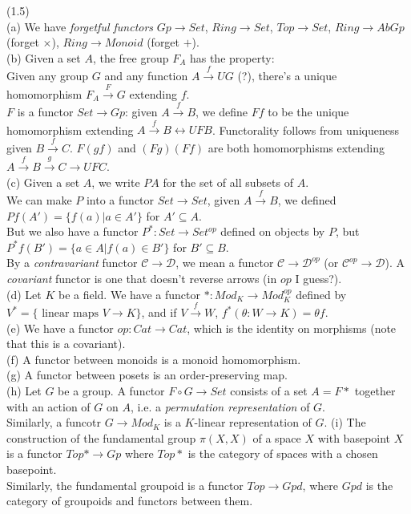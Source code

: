 \documentclass[a4paper]{article}
\begin{document}
\begin{eg} (1.5)\\
    (a) We have \emph{forgetful functors} $Gp \to Set$, $Ring\to Set$, $Top \to Set$, $Ring \to AbGp$ (forget $\times$), $Ring \to Monoid$ (forget $+$).\\
    (b) Given a set $A$, the free group $F_A$ has the property:\\
    Given any group $G$ and any function $A \xrightarrow{f} UG$ (?), there's a unique homomorphism $F_A \xrightarrow{F} G$ extending $f$.\\
    $F$ is a functor $Set\to Gp$: given $A \xrightarrow{f} B$, we define $Ff$ to be the unique homomorphism extending $A \xrightarrow{f} B \leftrightarrow UFB$. Functorality follows from uniqueness given $B \xrightarrow{f} C$. $F(gf)$ and $(Fg)(Ff)$ are both homomorphisms extending $A \xrightarrow{f} B \xrightarrow{g} C \rightarrow UFC$.\\
    (c) Given a set $A$, we write $PA$ for the set of all subsets of $A$.\\
    We can make $P$ into a functor $Set \to Set$, given $A \xrightarrow{f} B$, we defined $Pf(A') = \{f(a) | a \in A'\}$ for $A' \subseteq A$.\\
    But we also have a functor $P^* : Set \to Set^{op}$ defined on objects by $P$, but $P^* f(B') = \{a \in A | f(a) \in B'\}$ for $B' \subseteq B$.\\
    By a \emph{contravariant} functor $\mathcal{C} \to \mathcal{D}$, we mean a functor $\mathcal{C} \to \mathcal{D}^{op}$ (or $\mathcal{C}^{op} \to \mathcal{D}$). A \emph{covariant} functor is one that doesn't reverse arrows (in $op$ I guess?).\\
    (d) Let $K$ be a field. We have a functor $*:Mod_K \to Mod_K^{op}$ defined by $V^* = \{ \text{ linear maps }  V \to K\}$, and if $V \xrightarrow{f} W$, $f^*(\theta:W \to K) = \theta f$.\\
    (e) We have a functor $op: Cat \to Cat$, which is the identity on morphisms (note that this is a covariant).\\
    (f) A functor between monoids is a monoid homomorphism.\\
    (g) A functor between posets is an order-preserving map.\\
    (h) Let $G$ be a group. A functor $F \circ G \to Set$ consists of a set $A=F*$ together with an action of $G$ on $A$, i.e. a \emph{permutation representation} of $G$.\\
    Similarly, a funcotr $G \to Mod_K$ is a $K$-linear representation of $G$.
    (i) The construction of the fundamental group $\pi(X,X)$ of a space $X$ with basepoint $X$ is a functor $Top* \to Gp$ where $Top*$ is the category of spaces with a chosen basepoint.\\
    Similarly, the fundamental groupoid is a functor $Top \to Gpd$, where $Gpd$ is the category of groupoids and functors between them.
\end{eg}
\end{document}
